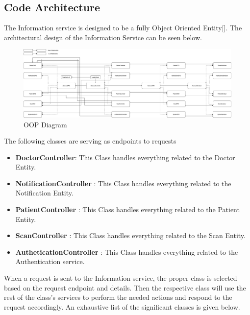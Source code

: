 		\subsection{Code Architecture}
			The Information service is designed to be a fully Object Oriented Entity[\cite{oop}].
			The architectural design of the Information Service can be seen below.\pagebreak
			\begin{figure}[H]
				\iftrue
				\caption{OOP Diagram}
				\centering
				 \includegraphics[angle=90,origin=c,scale=0.3]{figures/InformationServiceArchitecture}
				\fi
			\end{figure}\pagebreak
			The following classes are serving as endpoints to requests
			\begin{itemize}
				\item \textbf{DoctorController}: This Class handles everything related to the Doctor Entity.
				\item \textbf{NotificationController} : This Class handles everything related to the Notification Entity.
				\item \textbf{PatientController} : This Class handles everything related to the Patient Entity.
				\item \textbf{ScanController} : This Class handles everything related to the Scan Entity.
				\item \textbf{AutheticationController} : This Class handles everything related to the Authentication service.
			\end{itemize}
			When a request is sent to the Information service, the proper class is selected based on the request endpoint and details. 
			Then the respective class will use the rest of the class's services to perform the needed actions and respond to the 
			request accordingly. An exhaustive list of the significant classes is given below.
